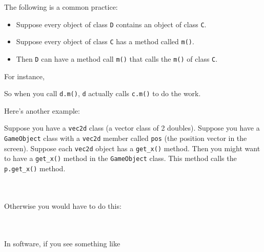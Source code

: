 \newpage{}

The following is a common practice:

\begin{itemize}
\item
  Suppose every object of class \texttt{D} contains an object of class
  \texttt{C}.
\item
  Suppose every object of class \texttt{C} has a method called \texttt{m()}.
\item
  Then \texttt{D} can have a method call \texttt{m()} that calls the
  \texttt{m()} of class \texttt{C}.
\end{itemize}

For instance,


So when you call \texttt{d.m()}, \texttt{d} actually calls \texttt{c.m()} to
do the work.

Here's another example:

Suppose you have a \texttt{vec2d} class (a vector class of 2 doubles).
Suppose you have a \texttt{GameObject} class with a \texttt{vec2d} member called \texttt{pos} (the position vector in the screen). Suppose each \texttt{vec2d} object has a \verb!get_x()! method. Then you might want to have a \verb!get_x()! method in the \texttt{GameObject} class. This method calls the \verb!p.get_x()! method.

\\
\\

Otherwise you would have to do this:

\\
\\

In software, if you see something like

\\

